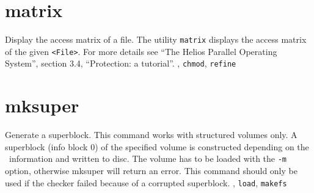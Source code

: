 \section{matrix}
\begin{man}
  \PP Display the access matrix of a file.
  \DE The utility {\tt matrix} displays the access matrix of the given {\tt <File>}.
             For more details see ``The Helios Parallel Operating System'',
             section 3.4, ``Protection: a tutorial''.
  , {\tt chmod}, {\tt refine}
\end{man}

\section{mksuper}
\begin{man}
  \PP Generate a superblock.
  \DE This command works with structured volumes only.
             A superblock (info block 0) of the specified volume is constructed
             depending on the \HEDI\ information and written to
             disc.
             The volume has to be loaded with the {\tt -m} option, otherwise
             mksuper will return an error.
             This command should only be used if the checker failed because of
             a corrupted superblock.
  , {\tt load}, {\tt makefs}
\end{man}

